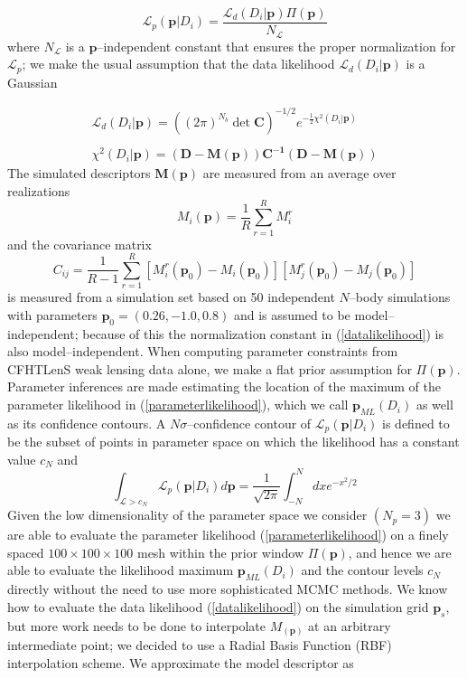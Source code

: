 \documentclass[reprint,aps,prd,superscriptaddress,showkeys,showpacs]{revtex4-1}
\begin{document}
\begin{equation}
\label{parameterlikelihood}
\mathcal{L}_p(\mathbf{p}\vert D_i) = \frac{\mathcal{L}_d(D_i\vert \mathbf{p})\Pi(\mathbf{p})}{N_{\mathcal{L}}}
\end{equation}
%
where $N_{\mathcal{L}}$ is a $\mathbf{p}$--independent constant that ensures the proper normalization for $\mathcal{L}_p$; we make the usual assumption that the data likelihood $\mathcal{L}_d(D_i\vert \mathbf{p})$ is a Gaussian

\begin{equation}
\label{datalikelihood}
\begin{matrix}
\mathcal{L}_d(D_i\vert \mathbf{p}) = ((2\pi)^{N_b}\det{\mathbf{C}})^{-1/2} e^{-\frac{1}{2}\chi^2(D_i\vert \mathbf{p})} \\ \\
\chi^2(D_i\vert \mathbf{p}) = \mathbf{(D - M(p))C^{-1}(D-M(p))}
\end{matrix}
\end{equation} 
%
The simulated descriptors $\mathbf{M(p)}$ are measured from an average over realizations
\begin{equation}
M_i(\mathbf{p}) = \frac{1}{R}\sum_{r=1}^R M_i^r 
\end{equation}
%
and the covariance matrix 
\begin{equation}
\label{datacov}
C_{ij} = \frac{1}{R-1} \sum_{r=1}^R [M_i^r(\mathbf{p}_0)-M_i(\mathbf{p}_0)][M_j^r(\mathbf{p}_0)-M_j(\mathbf{p}_0)]
\end{equation}
%
is measured from a simulation set based on 50 independent $N$--body simulations with parameters $\mathbf{p}_0=(0.26,-1.0,0.8)$ and is assumed to be model--independent; because of this the normalization constant in (\ref{datalikelihood}) is also model--independent. When computing parameter constraints from CFHTLenS weak lensing data alone, we make a flat prior assumption for $\Pi(\mathbf{p})$. Parameter inferences are made estimating the location of the maximum of the parameter likelihood in (\ref{parameterlikelihood}), which we call $\mathbf{p}_{ML}(D_i)$ as well as its confidence contours. A $N\sigma$--confidence contour of $\mathcal{L}_p(\mathbf{p}\vert D_i)$ is defined to be the subset of points in parameter space on which the likelihood has a constant value $c_N$ and 
\begin{equation}
\label{ennesigma}
\int_{\mathcal{L}>c_N} \mathcal{L}_p(\mathbf{p}\vert D_i) d\mathbf{p} = \frac{1}{\sqrt{2\pi}}\int_{-N}^N dx e^{-x^2/2}
\end{equation}
%
Given the low dimensionality of the parameter space we consider $(N_p=3)$ we are able to evaluate the parameter likelihood (\ref{parameterlikelihood}) on a finely spaced $100\times100\times100$ mesh within the prior window $\Pi(\mathbf{p})$, and hence we are able to evaluate the likelihood maximum $\mathbf{p}_{ML}(D_i)$ and the contour levels $c_N$ directly without the need to use more sophisticated MCMC methods. We know how to evaluate the data likelihood (\ref{datalikelihood}) on the simulation grid $\mathbf{p}_s$, but more work needs to be done to interpolate $M_(\mathbf{p})$ at an arbitrary intermediate point; we decided to use a Radial Basis Function (RBF) interpolation scheme. We approximate the model descriptor as
\end{document}
